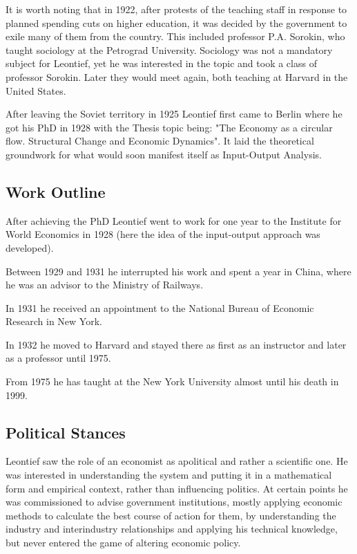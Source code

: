 \documentclass[12pt,a4paper]{scrartcl}
\begin{document}
	It is worth noting that in 1922, after protests of the teaching staff in response to planned spending cuts on higher education, it was decided by the government to exile many of them from the country. This included professor P.A. Sorokin, who taught sociology at the Petrograd University. Sociology was not a mandatory subject for Leontief, yet he was interested in the topic and took a class of professor Sorokin. Later they would meet again, both teaching at Harvard in the United States. \cite[p.353]{Kaliadina2006}
	
	After leaving the Soviet territory in 1925 Leontief first came to Berlin where he got his PhD in 1928 with the Thesis topic being: "The Economy as a circular flow. Structural Change and Economic Dynamics". It laid the theoretical groundwork for what would soon manifest itself as Input-Output Analysis.
	
	\subsection{Work Outline}
	
	After achieving the PhD Leontief went to work for one year to the Institute for World Economics in 1928 (here the idea of the input-output approach was developed).
	
	Between 1929 and 1931 he interrupted his work and spent a year in China, where he was an advisor to the Ministry of Railways.
	
	In 1931 he received an appointment to the National Bureau of Economic Research in New York.
	
	In 1932 he moved to Harvard and stayed there as first as an instructor and later as a professor until 1975.
	
	From 1975 he has taught at the New York University almost until his death in 1999.
		
	\subsection{Political Stances}
	
	Leontief saw the role of an economist as apolitical and rather a scientific one. He was interested in understanding the system and putting it in a mathematical form and empirical context, rather than influencing politics. At certain points he was commissioned to advise government institutions, mostly applying economic methods to calculate the best course of action for them, by understanding the industry and interindustry relationships and applying his technical knowledge, but never entered the game of altering economic policy. \cite[p.21]{Hamilton2008}
	
\end{document}
